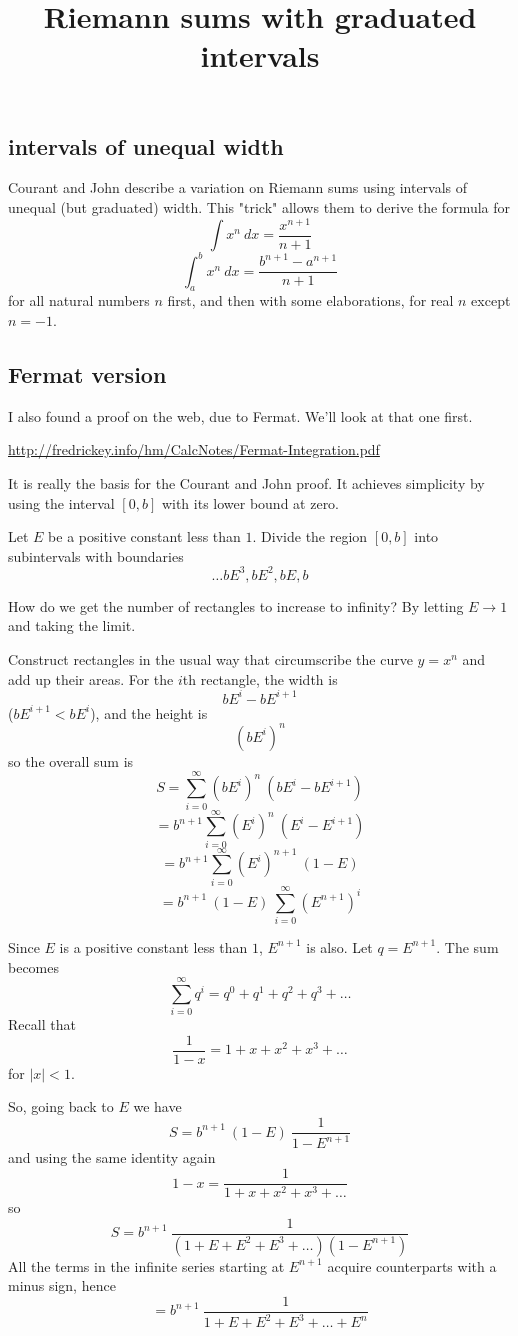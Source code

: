 \documentclass[11pt, oneside]{article}   	%
\title{Riemann sums with graduated intervals}
\date{}
\begin{document}
\maketitle
\Large

\subsection*{intervals of unequal width}
Courant and John describe a variation on Riemann sums using intervals of unequal (but graduated) width.  This "trick" allows them to derive the formula for 
\[ \int x^n \ dx = \frac{x^{n+1}}{n+1} \]
\[ \int_a^b x^n \ dx = \frac{b^{n+1} - a^{n+1}}{n+1} \]
for all natural numbers $n$ first, and then with some elaborations, for real $n$ except $n = -1$.

\subsection*{Fermat version}
I also found a proof on the web, due to Fermat.  We'll look at that one first.

\url{http://fredrickey.info/hm/CalcNotes/Fermat-Integration.pdf}

It is really the basis for the Courant and John proof.  It achieves simplicity by using the interval $[0,b]$ with its lower bound at zero.

Let $E$ be a positive constant less than $1$.  Divide the region $[0,b]$ into subintervals with boundaries 
\[ \dots bE^3, bE^2, bE, b \]

How do we get the number of rectangles to increase to infinity?  By letting $E \rightarrow 1$ and taking the limit.

Construct rectangles in the usual way that circumscribe the curve $y = x^n$ and add up their areas.  For the $i$th rectangle, the width is
\[ bE^i - bE^{i+1} \]
($bE^{i+1} < bE^i$), and the height is
\[ (bE^i)^n \]
so the overall sum is
\[ S = \sum_{i = 0}^{\infty} (bE^i)^n \ (bE^i - bE^{i+1}) \]
\[ = b^{n+1} \sum_{i = 0}^{\infty} (E^i)^n \ (E^i - E^{i+1}) \]
\[ = b^{n+1} \sum_{i = 0}^{\infty} (E^i)^{n+1} \ (1 - E) \]
\[ = b^{n+1} \ (1 - E) \ \sum_{i = 0}^{\infty} (E^{n+1})^i \]

Since $E$ is a positive constant less than $1$, $E^{n+1}$ is also.  Let $q = E^{n+1}$.  The sum becomes
\[ \sum_{i = 0}^{\infty} q^i = q^0 + q^1 + q^2 + q^3 + \dots \]
Recall that
\[ \frac{1}{1-x} = 1 + x + x^2 + x^3 + \dots \]
for $|x| < 1$.  

So, going back to $E$ we have
\[ S = b^{n+1} \ (1 - E) \ \frac{1}{1 - E^{n+1}} \]
and using the same identity again
\[ 1 - x = \frac{1}{1 + x + x^2 + x^3 + \dots } \]
so
\[ S = b^{n+1} \ \frac{1}{(1 + E + E^2 + E^3 + \dots)(1 - E^{n+1})} \]
All the terms in the infinite series starting at $E^{n+1}$ acquire counterparts with a minus sign, hence
\[ = b^{n+1} \ \frac{1}{1 + E + E^2 + E^3 + \dots + E^n} \]
\end{document}

